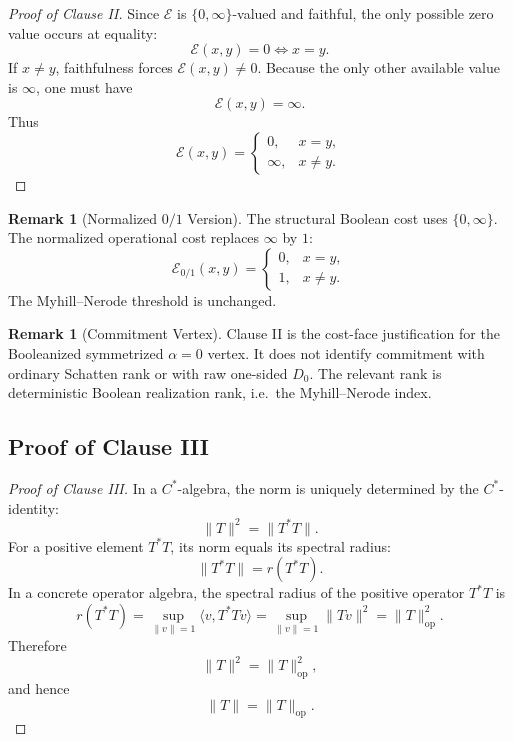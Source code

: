 \documentclass[12pt]{article}
\theoremstyle{definition}
\newtheorem{remark}[theorem]{Remark}
\begin{document}
\begin{proof}[Proof of Clause II]
Since $\mathcal E$ is $\{0,\infty\}$-valued and faithful, the only possible
zero value occurs at equality:
\[
\mathcal E(x,y)=0
\iff
x=y.
\]
If $x\neq y$, faithfulness forces $\mathcal E(x,y)\neq0$.  Because the only
other available value is $\infty$, one must have
\[
\mathcal E(x,y)=\infty.
\]
Thus
\[
\mathcal E(x,y)=
\begin{cases}
0,&x=y,\\
\infty,&x\neq y.
\end{cases}
\]
\end{proof}

\begin{remark}[Normalized $0/1$ Version]
\label{rem:clauseII-01}
The structural Boolean cost uses $\{0,\infty\}$.  The normalized operational
cost replaces $\infty$ by $1$:
\[
\mathcal E_{0/1}(x,y)=
\begin{cases}
0,&x=y,\\
1,&x\neq y.
\end{cases}
\]
The Myhill--Nerode threshold is unchanged.
\end{remark}

\begin{remark}[Commitment Vertex]
\label{rem:clauseII-commitment-vertex}
Clause II is the cost-face justification for the Booleanized symmetrized
$\alpha=0$ vertex.  It does not identify commitment with ordinary Schatten
rank or with raw one-sided $D_0$.  The relevant rank is deterministic Boolean
realization rank, i.e.\ the Myhill--Nerode index.
\end{remark}

\subsection{Proof of Clause III}
\label{subsec:proof-clause-III}

\begin{proof}[Proof of Clause III]
In a $C^*$-algebra, the norm is uniquely determined by the $C^*$-identity:
\[
\|T\|^2
=
\|T^*T\|.
\]
For a positive element $T^*T$, its norm equals its spectral radius:
\[
\|T^*T\|
=
r(T^*T).
\]
In a concrete operator algebra, the spectral radius of the positive operator
$T^*T$ is
\[
r(T^*T)
=
\sup_{\|v\|=1}
\langle v,T^*Tv\rangle
=
\sup_{\|v\|=1}
\|Tv\|^2
=
\|T\|_{\mathrm{op}}^2.
\]
Therefore
\[
\|T\|^2
=
\|T\|_{\mathrm{op}}^2,
\]
and hence
\[
\|T\|
=
\|T\|_{\mathrm{op}}.
\]
\end{proof}
\end{document}
